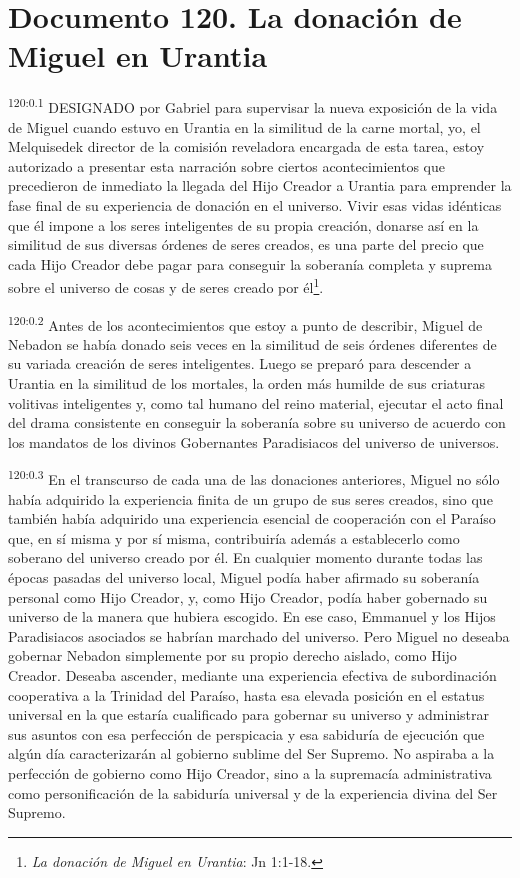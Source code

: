 \chapter{Documento 120. La donación de Miguel en Urantia}
\par 
\textsuperscript{120:0.1} DESIGNADO por Gabriel para supervisar la nueva exposición de la vida de Miguel cuando estuvo en Urantia en la similitud de la carne mortal, yo, el Melquisedek director de la comisión reveladora encargada de esta tarea, estoy autorizado a presentar esta narración sobre ciertos acontecimientos que precedieron de inmediato la llegada del Hijo Creador a Urantia para emprender la fase final de su experiencia de donación en el universo. Vivir esas vidas idénticas que él impone a los seres inteligentes de su propia creación, donarse así en la similitud de sus diversas órdenes de seres creados, es una parte del precio que cada Hijo Creador debe pagar para conseguir la soberanía completa y suprema sobre el universo de cosas y de seres creado por él\footnote{\textit{La donación de Miguel en Urantia}: Jn 1:1-18.}.

\par 
\textsuperscript{120:0.2} Antes de los acontecimientos que estoy a punto de describir, Miguel de Nebadon se había donado seis veces en la similitud de seis órdenes diferentes de su variada creación de seres inteligentes. Luego se preparó para descender a Urantia en la similitud de los mortales, la orden más humilde de sus criaturas volitivas inteligentes y, como tal humano del reino material, ejecutar el acto final del drama consistente en conseguir la soberanía sobre su universo de acuerdo con los mandatos de los divinos Gobernantes Paradisiacos del universo de universos.

\par 
\textsuperscript{120:0.3} En el transcurso de cada una de las donaciones anteriores, Miguel no sólo había adquirido la experiencia finita de un grupo de sus seres creados, sino que también había adquirido una experiencia esencial de cooperación con el Paraíso que, en sí misma y por sí misma, contribuiría además a establecerlo como soberano del universo creado por él. En cualquier momento durante todas las épocas pasadas del universo local, Miguel podía haber afirmado su soberanía personal como Hijo Creador, y, como Hijo Creador, podía haber gobernado su universo de la manera que hubiera escogido. En ese caso, Emmanuel y los Hijos Paradisiacos asociados se habrían marchado del universo. Pero Miguel no deseaba gobernar Nebadon simplemente por su propio derecho aislado, como Hijo Creador. Deseaba ascender, mediante una experiencia efectiva de subordinación cooperativa a la Trinidad del Paraíso, hasta esa elevada posición en el estatus universal en la que estaría cualificado para gobernar su universo y administrar sus asuntos con esa perfección de perspicacia y esa sabiduría de ejecución que algún día caracterizarán al gobierno sublime del Ser Supremo. No aspiraba a la perfección de gobierno como Hijo Creador, sino a la supremacía administrativa como personificación de la sabiduría universal y de la experiencia divina del Ser Supremo.

